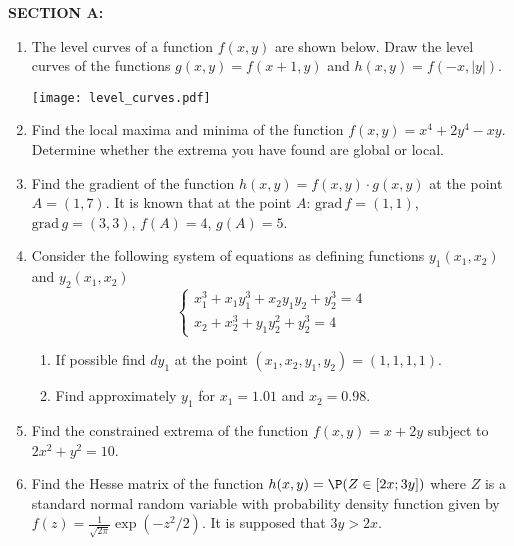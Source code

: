 \documentclass[pdftex,12pt,a4paper]{article}
\providecommand{\grad}{\mathrm{grad}\,}
\begin{document}
\textbf{SECTION A:}
\begin{enumerate}

\item The level curves of a function $f(x,y)$ are shown below. Draw the level curves of the functions $g(x,y)=f(x+1,y)$ and $h(x,y)=f(-x,|y|)$.

\begin{center}
    \texttt{[image: level\_curves.pdf]}
\end{center}

\item Find the local maxima and minima of the function $f(x,y)=x^4+2y^4-xy$. Determine whether the extrema you have found are global or local.

\item Find the gradient of the function $h(x,y)=f(x,y)\cdot g(x,y)$ at the point $A=(1,7)$. It is known that at the point $A$: $\grad f=(1,1)$, $\grad g=(3,3)$, $f(A)=4$, $g(A)=5$.

\item Consider the following system of equations as defining functions $y_1(x_1,x_2)$ and $y_2(x_1,x_2)$
\[
\left\{
\begin{array}{c}
x_1^3+x_1 y_1^3+x_2 y_1 y_2+y_2^3=4 \\ 
x_2+x_2^3+y_1 y_2^2+y_2^3=4
\end{array} 
\right.
\]
\begin{enumerate}
\item If possible find $dy_1$ at the point $(x_1,x_2,y_1,y_2)=(1,1,1,1)$.
\item Find approximately $y_1$ for $x_1=1.01$ and $x_2=0.98$.
\end{enumerate}
\item Find the constrained extrema of the function $f(x,y)=x+2y$ subject to $2x^2+y^2=10$.

\item Find the Hesse matrix of the function $h(x,y)=\P( Z \in [2x;3y])$ where $Z$ is a standard normal random variable with probability density function given by $f(z)=\frac{1}{\sqrt{2\pi}}\exp(-z^2/2)$. It is supposed that $3y>2x$.

\end{enumerate}
\end{document}
